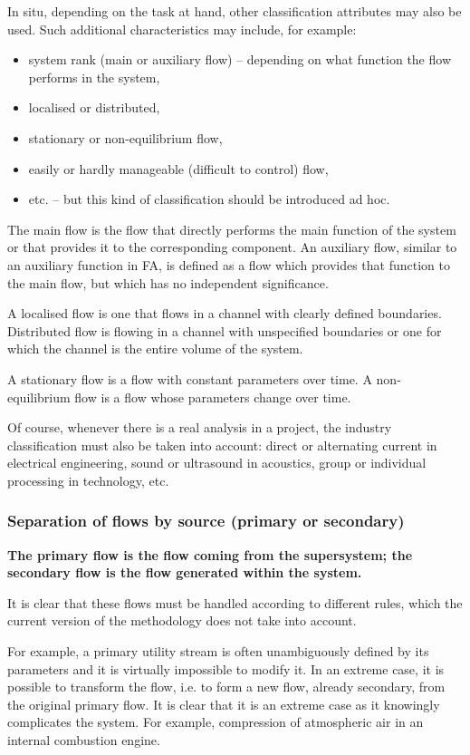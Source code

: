 \documentclass[a4paper,11pt]{article}
\begin{document}
In situ, depending on the task at hand, other classification attributes may
also be used. Such additional characteristics may include, for example:
\begin{itemize}
\item system rank (main or auxiliary flow) -- depending on what function the
  flow performs in the system,
\item localised or distributed,
\item stationary or non-equilibrium flow,
\item easily or hardly manageable (difficult to control) flow,
\item etc. -- but this kind of classification should be introduced ad hoc.
\end{itemize}
The main flow is the flow that directly performs the main function of the
system or that provides it to the corresponding component. An auxiliary flow,
similar to an auxiliary function in FA, is defined as a flow which provides
that function to the main flow, but which has no independent significance.

A localised flow is one that flows in a channel with clearly defined
boundaries. Distributed flow is flowing in a channel with unspecified
boundaries or one for which the channel is the entire volume of the system.

A stationary flow is a flow with constant parameters over time.  A
non-equilibrium flow is a flow whose parameters change over time.

Of course, whenever there is a real analysis in a project, the industry
classification must also be taken into account: direct or alternating current
in electrical engineering, sound or ultrasound in acoustics, group or
individual processing in technology, etc.

\subsubsection{Separation of flows by source (primary or secondary)}

\textbf{The primary flow is the flow coming from the supersystem; the
  secondary flow is the flow generated within the system.}

It is clear that these flows must be handled according to different rules,
which the current version of the methodology does not take into account.

For example, a primary utility stream is often unambiguously defined by its
parameters and it is virtually impossible to modify it. In an extreme case, it
is possible to transform the flow, i.e. to form a new flow, already secondary,
from the original primary flow. It is clear that it is an extreme case as it
knowingly complicates the system. For example, compression of atmospheric air
in an internal combustion engine.
\end{document}
